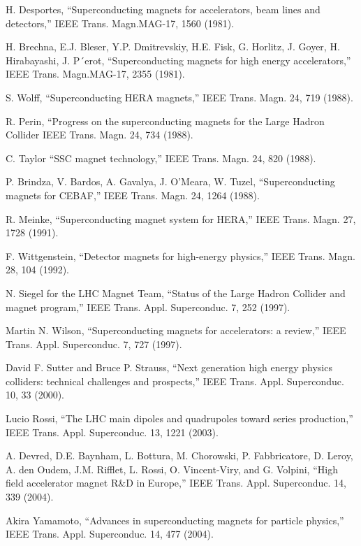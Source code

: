 \noindent [9.270] H. Desportes, ``Superconducting magnets for accelerators, beam lines and detectors,”
IEEE Trans. Magn.MAG-17, 1560 (1981).

\noindent [9.271] H. Brechna, E.J. Bleser, Y.P. Dmitrevskiy, H.E. Fisk, G. Horlitz, J. Goyer, H.
Hirabayashi, J. P´erot, ``Superconducting magnets for high energy accelerators,”
IEEE Trans. Magn.MAG-17, 2355 (1981).

\noindent [9.272] S. Wolff, ``Superconducting HERA magnets,” IEEE Trans. Magn. 24, 719 (1988).

\noindent [9.273] R. Perin, ``Progress on the superconducting magnets for the Large Hadron Collider
IEEE Trans. Magn. 24, 734 (1988).

\noindent [9.274] C. Taylor ``SSC magnet technology,” IEEE Trans. Magn. 24, 820 (1988).

\noindent [9.275] P. Brindza, V. Bardos, A. Gavalya, J. O’Meara, W. Tuzel, ``Superconducting
magnets for CEBAF,” IEEE Trans. Magn. 24, 1264 (1988).

\noindent [9.276] R. Meinke, ``Superconducting magnet system for HERA,” IEEE Trans. Magn. 27,
1728 (1991).

\noindent [9.277] F. Wittgenstein, ``Detector magnets for high-energy physics,” IEEE Trans. Magn.
28, 104 (1992).

\noindent [9.278] N. Siegel for the LHC Magnet Team, ``Status of the Large Hadron Collider and
magnet program,” IEEE Trans. Appl. Superconduc. 7, 252 (1997).

\noindent [9.279] Martin N. Wilson, ``Superconducting magnets for accelerators: a review,” IEEE
Trans. Appl. Superconduc. 7, 727 (1997).

\noindent [9.280] David F. Sutter and Bruce P. Strauss, ``Next generation high energy physics
colliders: technical challenges and prospects,” IEEE Trans. Appl. Superconduc.
10, 33 (2000).

\noindent [9.281] Lucio Rossi, ``The LHC main dipoles and quadrupoles toward series production,”
IEEE Trans. Appl. Superconduc. 13, 1221 (2003).

\noindent [9.282] A. Devred, D.E. Baynham, L. Bottura, M. Chorowski, P. Fabbricatore, D. Leroy,
A. den Oudem, J.M. Rifflet, L. Rossi, O. Vincent-Viry, and G. Volpini, ``High
field accelerator magnet R\&D in Europe,” IEEE Trans. Appl. Superconduc. 14,
339 (2004).

\noindent [9.283] Akira Yamamoto, ``Advances in superconducting magnets for particle physics,”
IEEE Trans. Appl. Superconduc. 14, 477 (2004).

